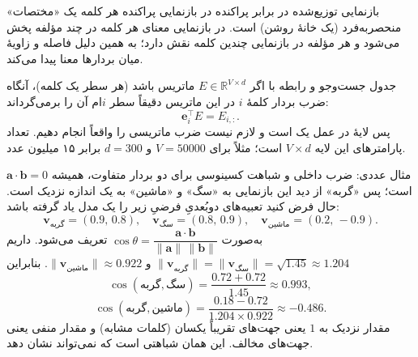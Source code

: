 \begin{definitionbox}{بازنمایی توزیع‌شده در برابر پراکنده}
در بازنمایی پراکنده هر کلمه یک «مختصات» منحصربه‌فرد (یک خانهٔ روشن) است. در بازنمایی  معنای هر کلمه در چند مؤلفه پخش می‌شود و هر مؤلفه در بازنمایی چندین کلمه نقش دارد؛ به همین دلیل فاصله و زاویهٔ میان بردارها معنا پیدا می‌کند.
\end{definitionbox}

\begin{addedbox}{جدول جست‌وجو و رابطه با }
اگر $E\in\mathbb{R}^{V\times d}$ ماتریس  باشد (هر سطر یک کلمه)، آنگاه ضرب بردار  کلمهٔ $i$ در این ماتریس دقیقاً سطر $i$ام آن را برمی‌گرداند:
\[
\mathbf{e}_i^{\top}E = E_{i,:}.
\]
پس لایهٔ  در عمل یک  است و لازم نیست ضرب ماتریسی را واقعاً انجام دهیم. تعداد پارامترهای این لایه $V\times d$ است؛ مثلاً برای $V=50000$ و $d=300$ برابر ۱۵ میلیون عدد.
\end{addedbox}

\begin{addedbox}{مثال عددی: ضرب داخلی و شباهت کسینوسی}
برای دو بردار  متفاوت، همیشه $\mathbf{a}\cdot\mathbf{b}=0$ است؛ پس «گربه» از دید این بازنمایی به «سگ» و «ماشین» به یک اندازه نزدیک است. حال فرض کنید تعبیه‌های دوبُعدیِ فرضیِ زیر را یک مدل یاد گرفته باشد:
\[
\mathbf{v}_{\text{گربه}}=(0.9,\,0.8),\quad
\mathbf{v}_{\text{سگ}}=(0.8,\,0.9),\quad
\mathbf{v}_{\text{ماشین}}=(0.2,\,-0.9).
\]
 به‌صورت $\cos\theta=\dfrac{\mathbf{a}\cdot\mathbf{b}}{\|\mathbf{a}\|\,\|\mathbf{b}\|}$ تعریف می‌شود. داریم $\|\mathbf{v}_{\text{گربه}}\|=\|\mathbf{v}_{\text{سگ}}\|=\sqrt{1.45}\approx1.204$ و $\|\mathbf{v}_{\text{ماشین}}\|\approx0.922$. بنابراین
\[
\cos(\text{گربه},\text{سگ})=\frac{0.72+0.72}{1.45}\approx 0.993,
\]
\[
\cos(\text{گربه},\text{ماشین})=\frac{0.18-0.72}{1.204\times0.922}\approx -0.486 .
\]
مقدار نزدیک به $1$ یعنی جهت‌های تقریباً یکسان (کلمات مشابه) و مقدار منفی یعنی جهت‌های مخالف. این همان شباهتی است که  نمی‌تواند نشان دهد.
\end{addedbox}


